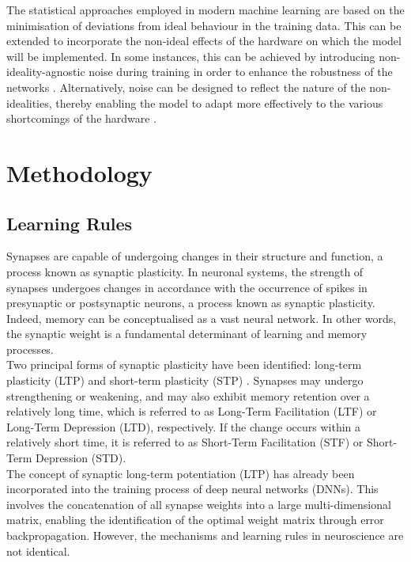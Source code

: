 \noindent The statistical approaches employed in modern machine learning are based on the minimisation of deviations from ideal behaviour in the training data. This can be extended to incorporate the non-ideal effects of the hardware on which the model will be implemented. In some instances, this can be achieved by introducing non-ideality-agnostic noise during training in order to enhance the robustness of the networks \cite{ye2023improving}. Alternatively, noise can be designed to reflect the nature of the non-idealities, thereby enabling the model to adapt more effectively to the various shortcomings of the hardware \cite{huang2021method}.

\section[Methodology]{Methodology}

\subsection[Learning Rules]{Learning Rules}

Synapses are capable of undergoing changes in their structure and function, a process known as synaptic plasticity. In neuronal systems, the strength of synapses undergoes changes in accordance with the occurrence of spikes in presynaptic or postsynaptic neurons, a process known as synaptic plasticity. Indeed, memory can be conceptualised as a vast neural network. In other words, the synaptic weight is a fundamental determinant of learning and memory processes.\\

\noindent Two principal forms of synaptic plasticity have been identified: long-term plasticity (LTP) \cite{bear1994synaptic} and short-term plasticity (STP) \cite{zucker2002short}. Synapses may undergo strengthening or weakening, and may also exhibit memory retention over a relatively long time, which is referred to as Long-Term Facilitation (LTF) or Long-Term Depression (LTD), respectively. If the change occurs within a relatively short time, it is referred to as Short-Term Facilitation (STF) or Short-Term Depression (STD).  \\

\noindent The concept of synaptic long-term potentiation (LTP) has already been incorporated into the training process of deep neural networks (DNNs). This involves the concatenation of all synapse weights into a large multi-dimensional matrix, enabling the identification of the optimal weight matrix through error backpropagation. However, the mechanisms and learning rules in neuroscience are not identical. \\

